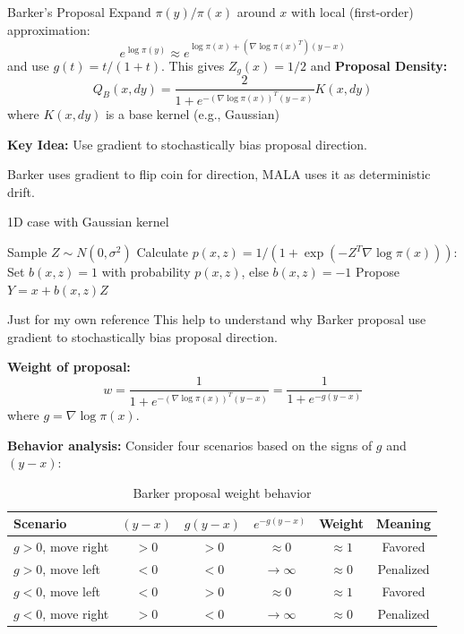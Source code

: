 \begin{frame}{Barker's Proposal}
	Expand $\pi(y)/\pi(x)$ around $x$ with local (first-order) approximation:
	$$e^{\log\pi(y)}  \approx e^{\log\pi(x)+  (\nabla\log\pi(x)^T)(y-x) }$$
	and use $g(t) = t/(1+t)$. This gives $Z_g(x) = 1/2$
	and \textbf{Proposal Density:}
	$$Q_B(x, dy) = \frac{2}{1 + e^{-(\nabla\log\pi(x))^T(y-x)}} K(x, dy)$$
	where $K(x, dy)$ is a base kernel (e.g., Gaussian)

	\textbf{Key Idea:} Use gradient to stochastically bias proposal direction.

	Barker uses gradient to flip coin for direction, MALA uses it as deterministic drift.
	\begin{algorithm}[H]
		\caption{1D case with Gaussian kernel}
		\begin{algorithmic}
			\STATE Sample $Z \sim N(0, \sigma^2)$
			\STATE Calculate $p(x, z) = 1/(1 + \exp(-Z^T\nabla\log\pi(x)))$:
			\STATE Set $b(x,z) = 1$ with probability $p(x,z)$, else $b(x,z) = -1$
			\STATE Propose $Y = x + b(x,z)Z$
		\end{algorithmic}
	\end{algorithm}
\end{frame}

\begin{frame}{Just for my own reference}
	This help to understand why Barker proposal use gradient to
	stochastically bias proposal direction.

	\textbf{Weight of proposal:}
	$$w = \frac{1}{1 + e^{-(\nabla\log\pi(x))^T(y-x)}} = \frac{1}{1 + e^{-g(y-x)}}$$
	where $g = \nabla\log\pi(x)$.

	\textbf{Behavior analysis:} Consider four scenarios based on the signs of $g$ and $(y-x)$:
	\begin{table}[h]
		\centering
		\begin{tabular}{lccccc}
			\toprule
			\textbf{Scenario} & $(y-x)$ & $g(y-x)$ & $e^{-g(y-x)}$ & \textbf{Weight} & \textbf{Meaning} \\
			\midrule
			$g>0$, move right & $>0$    & $>0$     & $\approx 0$   & $\approx 1$     & Favored          \\
			$g>0$, move left  & $<0$    & $<0$     & $\to \infty$  & $\approx 0$     & Penalized        \\
			$g<0$, move left  & $<0$    & $>0$     & $\approx 0$   & $\approx 1$     & Favored          \\
			$g<0$, move right & $>0$    & $<0$     & $\to \infty$  & $\approx 0$     & Penalized        \\
			\bottomrule
		\end{tabular}
		\caption{Barker proposal weight behavior}
		\label{tab:barker}
	\end{table}
\end{frame}

